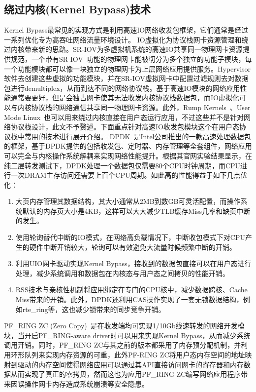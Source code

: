 \subsection{绕过内核(Kernel Bypass)技术}
\label{subsec:02_dpdk}

Kernel Bypass最常见的实现方式是利用高速IO网络收发包框架，它们通常是经过一系列优化专为高吞吐网络流量环境设计。 IO虚拟化为协议栈网卡资源管理和绕过内核带来新的思路。SR-IOV为多虚拟机系统的高速IO共享同一物理网卡资源提供规范，一个带有SR-IOV~\cite{dong2012high}功能的物理网卡能被切分为多个独立的功能子模块，每一个功能模块都可以像一块独立的物理网卡为上层网络应用提供服务。Hypervisor软件去创建这些虚拟的功能模块，并在SR-IOV虚拟网卡中配置过滤规则去对数据包进行demultiplex，从而到达不同的网络协议栈。基于高速IO模块的网络应用性能通常要更好，但是会独占网卡使其无法收发内核协议栈数据包，而IO虚拟化可以与内核协议栈的网络通信共享同一物理网卡资源。此外，Rump Kernels~\cite{kantee2014rump}、User Mode Linux~\cite{dike2001user}也可以用来绕过内核直接在用户态运行应用，不过这些并不是针对网络协议栈设计，此文不予赘述。下面重点针对高速IO收发包模块这个在用户态协议栈中常用的技术进行展开介绍。
DPDK~\cite{DPDK}是Intel公司推出的一款高速处理数据包的框架，基于DPDK提供的包括收发包、定时器、内存管理等全套组件，网络应用可以完全与内核操作系统解耦来实现网络性能提升。根据其官网实验结果显示，在纯二层转发测试下，DPDK处理一个数据包仅需要80个CPU时钟周期，而CPU进行一次DRAM主存访问还需要上百个CPU周期。如此高的性能得益于如下几点优化：

\begin{enumerate}[(1),labelsep=.5em, leftmargin = 0pt, itemindent = 3em]
\item 大页内存管理其数据结构，其大小通常从2MB到数GB可灵活配置，而操作系统默认的内存页大小是4KB，这样可以大大减少TLB缓存Miss几率和缺页中断的发生。
\item 使用轮询替代中断的IO模式，在网络高负载情况下，中断收包模式下对CPU产生的硬件中断开销较大，轮询可以有效避免大流量时候频繁中断的开销。
\item 利用UIO网卡驱动实现Kernel Bypass，接收到的数据包直接可以在用户态进行处理，减少系统调用和数据包在内核态与用户态之间拷贝的性能开销。
\item RSS技术与亲核性机制将应用绑定在专门的CPU核中，减少数据跨核、Cache Miss带来的开销。此外，DPDK还利用CAS操作实现了一套无锁数据结构，例如rte\_ring等，这也减少锁带来的同步竞争开销。
\end{enumerate}

PF\_RING ZC (Zero Copy)~\cite{PF_RING}是在收发端均可实现1/10Gb线速转发的网络开发模块，当开启PF\_RING-aware driver时可以用来实现Kernel Bypass，从而减少系统调用开销。同时，PF\_RING ZC与其之前的版本都采用了内存预分配机制，并利用环形队列来实现内存资源的可重，此外PF-RING ZC将用户态内存空间的地址映射到驱动的内存空间使得网络应用可以通过其API直接访问网卡的寄存器和内存数据从而实现了真正的零拷贝，然而这也为应用PF\_RING ZC编写网络应用程序带来因误操作网卡内存造成系统崩溃等安全隐患。

